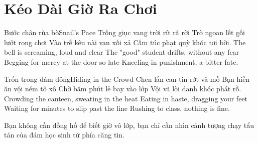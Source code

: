 \chapter{Kéo Dài Giờ Ra Chơi}

\begin{tutuyetbox}{Bước chân rùa bò}{Snail's Pace}
Trống giục vang trời rít rã rời
Trò ngoan lết gối lướt rong chơi
Vào trễ kêu nài van xối xả
Cấm túc phạt quỳ khóc tơi bời.
\tcblower
The bell is screaming, loud and clear 
The "good" student drifts, without any fear 
Begging for mercy at the door so late 
Kneeling in punishment, a bitter fate.
\end{tutuyetbox}

\begin{tutuyetbox}{Trốn trong đám đông}{Hiding in the Crowd}
Chen lấn can-tin rớt vã mồ
Bạn hiền ăn vội ném tô xô
Chờ băm phút lẻ bay vào lớp
Vội vã lòi danh khóc phát rồ.
\tcblower
Crowding the canteen, sweating in the heat 
Eating in haste, dragging your feet 
Waiting for minutes to slip past the line 
Rushing to class, nothing is fine.
\end{tutuyetbox}

\begin{ghichu}
Bạn không cần đồng hồ để biết giờ vô lớp, bạn chỉ cần nhìn cảnh tượng chạy tẩu tán của đám học sinh từ phía căng tin.
\end{ghichu}